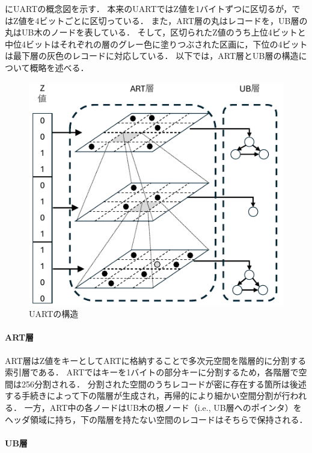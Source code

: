 \Fig{\ref{fig:uart}}にUARTの概念図を示す．
本来のUARTではZ値を1バイトずつに区切るが，\Fig{\ref{fig:uart}}ではZ値を4ビットごとに区切っている．
また，ART層の丸はレコードを，UB層の丸はUB木のノードを表している．
そして，区切られたZ値のうち上位4ビットと中位4ビットはそれぞれの層のグレー色に塗りつぶされた区画に，下位の4ビットは最下層の灰色のレコードに対応している．
以下では，ART層とUB層の構造について概略を述べる．

\begin{figure}[t]
  \centering
  \includegraphics{./figures/fig_uart.pdf}
  \caption{UARTの構造}
  \label{fig:uart}
\end{figure}

\paragraph{ART層}

ART層はZ値をキーとしてARTに格納することで多次元空間を階層的に分割する索引層である．
ARTではキーを1バイトの部分キーに分割するため，各階層で空間は256分割される．
分割された空間のうちレコードが密に存在する箇所は後述する手続きによって下の階層が生成され，再帰的により細かい空間分割が行われる．
一方，ART中の各ノードはUB木の根ノード（i.e., UB層へのポインタ）をヘッダ領域に持ち，下の階層を持たない空間のレコードはそちらで保持される．

\paragraph{UB層}

